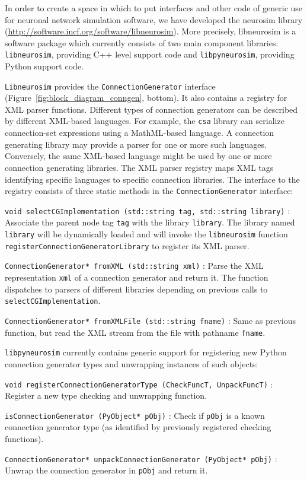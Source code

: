 \documentclass{frontiersSCNS} %
\newcommand{\Figure}[2]{Figure~\ref{#2}}
\newcommand{\Figure}[2]{Figure~#1}
\begin{document}
In order to create a space in which to put interfaces and other code
of generic use for neuronal network simulation software, we have
developed the neurosim library
(\url{http://software.incf.org/software/libneurosim}).  More
precisely, libneurosim is a software package which currently consists
of two main component libraries: \verb|libneurosim|, providing C++
level support code and \verb|libpyneurosim|, providing Python support
code.

\verb|Libneurosim| provides the \verb|ConnectionGenerator| interface
(\Figure{2}{fig:block_diagram_conngen}, bottom). It also contains a
registry for XML parser functions.  Different types of connection
generators can be described by different XML-based languages.  For
example, the \verb|csa| library can serialize connection-set
expressions using a MathML-based language.  A connection generating
library may provide a parser for one or more such languages.
Conversely, the same XML-based language might be used by one or more
connection generating libraries.  The XML parser registry maps XML
tags identifying specific languages to specific connection libraries.
The interface to the registry consists of three static methods in the
\verb|ConnectionGenerator| interface:

\begin{unlist}
\item[\tt void selectCGImplementation (std::string tag, std::string
  library)]:\\ Associate the parent node tag \verb|tag| with the library
  \verb|library|.  The library named \verb|library| will be
  dynamically loaded and will invoke the \verb|libneurosim| function
  \verb|registerConnectionGeneratorLibrary| to register its XML
  parser.
\item[\tt ConnectionGenerator* fromXML (std::string xml)]: Parse the
  XML representation \verb|xml| of a connection generator and return
  it. The function dispatches to parsers of different libraries
  depending on previous calls to \verb|selectCGImplementation|.
\item[\tt ConnectionGenerator* fromXMLFile (std::string fname)]: Same
  as previous function, but read the XML stream from the file with
  pathname \verb|fname|.
\end{unlist}

\verb|libpyneurosim| currently contains generic support for
registering new Python connection generator types and unwrapping
instances of such objects:

\begin{unlist}
\item[\tt void registerConnectionGeneratorType (CheckFuncT,
  UnpackFuncT)]: Register a new type checking and unwrapping
  function.
\item[\tt isConnectionGenerator (PyObject* pObj)]: Check if
  \verb|pObj| is a known connection generator type (as identified by
  previously registered checking functions).
\item[\tt ConnectionGenerator* unpackConnectionGenerator (PyObject*
  pObj)]: Unwrap the connection generator in \verb|pObj| and return
  it.
\end{unlist}
\end{document}
